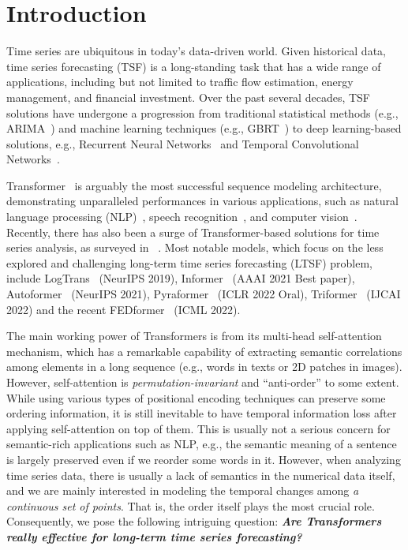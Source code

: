 \section{Introduction}
\label{sec:intro}


Time series are ubiquitous in today's data-driven world. Given historical data, time series forecasting (TSF) is a long-standing task that
has a wide range of applications, including but not limited to traffic flow estimation, energy management, and financial investment.
%
Over the past several decades, TSF solutions have undergone a progression from traditional statistical methods (e.g., ARIMA~\cite{ariyo2014arima}) and machine learning techniques (e.g., GBRT~\cite{gbrt}) to deep learning-based solutions, e.g., Recurrent Neural Networks~\cite{GuokunLai2017lstm} and Temporal Convolutional Networks~\cite{bai2018empirical,liu2021time}. 
%

Transformer~\cite{vaswani2017attention} is arguably the most successful sequence modeling architecture, demonstrating unparalleled performances in various applications, such as natural language processing (NLP)~\cite{devlin2018bert}, speech recognition~\cite{dong2018speech}, and computer vision~\cite{liu2021swin,zeng2022deciwatch}. 
%
Recently, there has also been a surge of Transformer-based solutions for time series analysis, as surveyed in ~\cite{wen2022transformers}. Most notable models, which focus on the less explored and challenging long-term time series forecasting (LTSF) problem, include LogTrans~\cite{li2019LogTrans} (NeurIPS 2019), Informer~\cite{informer} (AAAI 2021 Best paper), Autoformer~\cite{xu2021autoformer} (NeurIPS 2021), Pyraformer~\cite{liu2021pyraformer} (ICLR 2022 Oral), Triformer~\cite{cirstea2022triformer} (IJCAI 2022) and the recent FEDformer~\cite{zhou2022fedformer} (ICML 2022). 


The main working power of Transformers is from its multi-head self-attention mechanism, which has a remarkable capability of extracting semantic correlations among elements in a long sequence (e.g., words in texts or 2D patches in images). However, self-attention is \emph{permutation-invariant} and ``anti-order'' to some extent. While using various types of positional encoding techniques can preserve some ordering information, it is still inevitable to have temporal information loss after applying self-attention on top of them. This is usually not a serious concern for semantic-rich applications such as NLP, e.g., the semantic meaning of a sentence is largely preserved even if we reorder some words in it. However, when analyzing time series data, there is usually a lack of semantics in the numerical data itself, and we are mainly interested in modeling the temporal changes among \emph{a continuous set of points}. That is, the order itself plays the most crucial role. Consequently, we pose the following intriguing question: \textbf{\emph{Are Transformers really effective for long-term time series forecasting?}}


